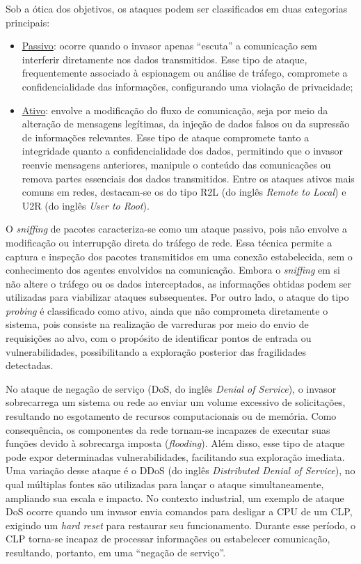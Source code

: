         Sob a ótica dos objetivos, os ataques podem ser classificados em duas categorias principais:

        \begin{itemize}
            \item \underline{Passivo}: ocorre quando o invasor apenas ``escuta'' a comunicação sem interferir diretamente nos dados transmitidos. Esse tipo de ataque, frequentemente associado à espionagem ou análise de tráfego, compromete a confidencialidade das informações, configurando uma violação de privacidade;
            \item \underline{Ativo}: envolve a modificação do fluxo de comunicação, seja por meio da alteração de mensagens legítimas, da injeção de dados falsos ou da supressão de informações relevantes. Esse tipo de ataque compromete tanto a integridade quanto a confidencialidade dos dados, permitindo que o invasor reenvie mensagens anteriores, manipule o conteúdo das comunicações ou remova partes essenciais dos dados transmitidos. Entre os ataques ativos mais comuns em redes, destacam-se os do tipo R2L (do inglês \textit{Remote to Local}) e U2R (do inglês \textit{User to Root}).
        \end{itemize}
        
        O \textit{sniffing} de pacotes caracteriza-se como um ataque passivo, pois não envolve a modificação ou interrupção direta do tráfego de rede. Essa técnica permite a captura e inspeção dos pacotes transmitidos em uma conexão estabelecida, sem o conhecimento dos agentes envolvidos na comunicação. Embora o \textit{sniffing} em si não altere o tráfego ou os dados interceptados, as informações obtidas podem ser utilizadas para viabilizar ataques subsequentes. Por outro lado, o ataque do tipo \textit{probing} é classificado como ativo, ainda que não comprometa diretamente o sistema, pois consiste na realização de varreduras por meio do envio de requisições ao alvo, com o propósito de identificar pontos de entrada ou vulnerabilidades, possibilitando a exploração posterior das fragilidades detectadas.
        
        No ataque de negação de serviço (DoS, do inglês \textit{Denial of Service}), o invasor sobrecarrega um sistema ou rede ao enviar um volume excessivo de solicitações, resultando no esgotamento de recursos computacionais ou de memória. Como consequência, os componentes da rede tornam-se incapazes de executar suas funções devido à sobrecarga imposta (\textit{flooding}). Além disso, esse tipo de ataque pode expor determinadas vulnerabilidades, facilitando sua exploração imediata. Uma variação desse ataque é o DDoS (do inglês \textit{Distributed Denial of Service}), no qual múltiplas fontes são utilizadas para lançar o ataque simultaneamente, ampliando sua escala e impacto. No contexto industrial, um exemplo de ataque DoS ocorre quando um invasor envia comandos para desligar a CPU de um CLP, exigindo um \textit{hard reset} para restaurar seu funcionamento. Durante esse período, o CLP torna-se incapaz de processar informações ou estabelecer comunicação, resultando, portanto, em uma ``negação de serviço''.

